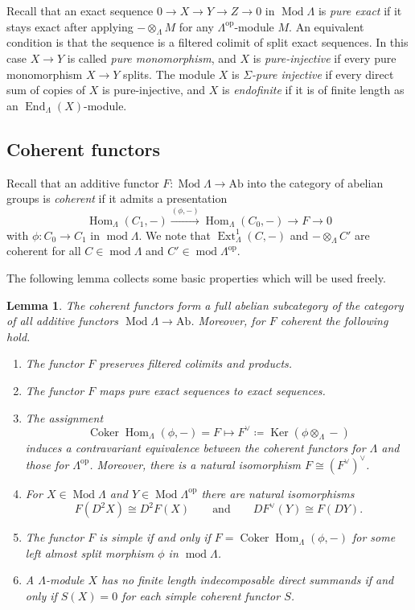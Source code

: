 \documentclass[a4paper]{amsart}
\theoremstyle{plain}
\newtheorem{lem}[thm]{Lemma}
\theoremstyle{definition}
\theoremstyle{remark}
\numberwithin{equation}{section}
\newcommand{\Coker}{\operatorname{Coker}}
\newcommand{\End}{\operatorname{End}}
\newcommand{\Ext}{\operatorname{Ext}}
\newcommand{\Hom}{\operatorname{Hom}}
\newcommand{\Ker}{\operatorname{Ker}}
\renewcommand{\mod}{\operatorname{mod}}
\newcommand{\Mod}{\operatorname{Mod}}
\newcommand{\Ab}{\mathrm{Ab}}
\newcommand{\op}{\mathrm{op}}
\def\La{\Lambda}
\def\Si{\Sigma}
\begin{document}
Recall that an exact sequence $0\to X\to Y\to Z\to 0$ in $\Mod\La$ is
\emph{pure exact} if it stays exact after applying $-\otimes_\La M$
for any $\La^\op$-module $M$. An equivalent condition is that the
sequence is a filtered colimit of split exact sequences. In this case
$X\to Y$ is called \emph{pure monomorphism}, and $X$ is
\emph{pure-injective} if every pure monomorphism $X\to Y$ splits. The
module $X$  is \emph{$\Si$-pure injective} if every direct sum of copies
of $X$ is pure-injective, and $X$ is \emph{endofinite} if it is of finite
length as an $\End_\La(X)$-module.

\subsection*{Coherent functors} 

Recall that an additive functor $F\colon\Mod\Lambda\to\Ab$ into the
category of abelian groups is \emph{coherent} if it admits a presentation
\[ \Hom_\Lambda(C_1,-) \xrightarrow{(\phi,-)} \Hom_\Lambda(C_0,-) \longrightarrow F \longrightarrow 0 \]
with $\phi\colon C_0 \to C_1$ in $\mod\Lambda$. We note that $\Ext^1_\Lambda(C,-)$ and $-\otimes_\Lambda C'$ are coherent for all $C\in\mod\Lambda$ and $C'\in\mod\Lambda^\op$.

The following lemma collects some basic properties which will be used freely.

\begin{lem}\label{le:coherent}
The coherent functors form a full abelian subcategory of the
category of all additive functors $\Mod\Lambda\to\Ab$. 
Moreover, for $F$ coherent the following hold.
\begin{enumerate}
\item The functor $F$ preserves filtered colimits and products.
\item The functor $F$ maps pure exact sequences to exact sequences.
\item The assignment  \[ \Coker\Hom_\Lambda(\phi,-) = F \longmapsto F^\vee\coloneqq \Ker(\phi\otimes_\Lambda-) \]
induces a contravariant equivalence between the coherent functors for
$\Lambda$ and those for $\Lambda^\op$. Moreover, there is a natural
isomorphism $F\cong
(F^\vee)^\vee$. 
\item  For $X\in\Mod\Lambda$ and  $Y\in\Mod\La^\op$ there are natural isomorphisms
  \[F(D^2X)\cong D^2F(X)\qquad\text{and}\qquad DF^\vee(Y)\cong F(DY).\] 
\item The functor $F$ is simple if and only if $F=\Coker\Hom_\Lambda(\phi,-)$ for some left almost split morphism $\phi$ in $\mod\Lambda$.
\item A $\La$-module $X$ has no finite length indecomposable direct summands if and only if $S(X)= 0$ for each simple coherent functor $S$.
\end{enumerate}
\end{lem}  
\end{document}
